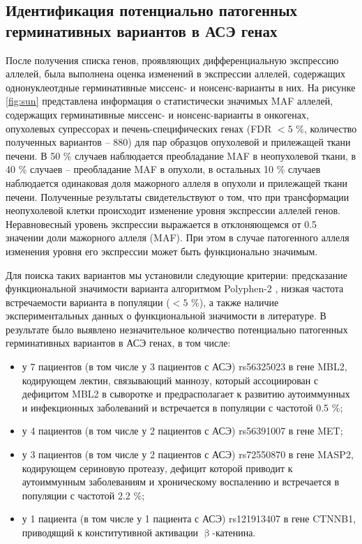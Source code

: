 \subsection{Идентификация потенциально патогенных герминативных вариантов в АСЭ генах}

После получения списка генов, проявляющих дифференциальную экспрессию аллелей, была выполнена оценка изменений в экспрессии аллелей, содержащих  однонуклеотдные герминативные миссенс- и нонсенс-варианты в них. На рисунке \ref{fig:sun} представлена информация о статистически значимых MAF аллелей, содержащих герминативные миссенс- и нонсенс-варианты в онкогенах, опухолевых супрессорах и печень-специфических генах (FDR $< 5$ \%, количество полученных вариантов -- 880) для пар образцов опухолевой и прилежащей ткани печени. В 50 \% случаев наблюдается преобладание MAF в неопухолевой ткани, в 40 \% случаев -- преобладание MAF в опухоли, в остальных 10 \% случаев наблюдается одинаковая доля мажорного аллеля в опухоли и прилежащей ткани печени. Полученные результаты свидетельствуют о том, что при трансформации неопухолевой клетки происходит изменение уровня экспрессии аллелей генов. Неравновесный уровень экспрессии выражается в отклоняющемся от 0.5 значении доли мажорного аллеля (MAF). При этом в случае патогенного аллеля изменения уровня его экспрессии может быть функционально значимым.


Для поиска таких вариантов мы установили следующие критерии: предсказание функциональной значимости варианта алгоритмом Polyphen-2 \cite{adzhubei_predicting_2013}, низкая частота встречаемости варианта в популяции ($< 5$ \%), а также наличие экспериментальных данных о функциональной значимости в литературе. В результате было выявлено незначительное количество потенциально патогенных герминативных вариантов в АСЭ генах, в том числе:

\begin{itemize}
	\item у 7 пациентов (в том числе у 3 пациентов с АСЭ) rs56325023 в гене MBL2, кодирующем лектин, связывающий маннозу, который ассоциирован с дефицитом MBL2 в сыворотке и предрасполагает к развитию аутоиммунных и инфекционных заболеваний и встречается в популяции с частотой 0.5 \%;
	\item у 4 пациентов (в том числе у 2 пациентов с АСЭ) rs56391007 в гене MET;
	\item у 3 пациентов (в том числе у 2 пациентов с АСЭ) rs72550870 в гене MASP2, кодирующем сериновую протеазу, дефицит которой приводит к аутоиммунным заболеваниям и хроническому воспалению и встречается в популяции с частотой 2.2 \%;
	\item у 1 пациента (в том числе у 1 пациента с АСЭ) rs121913407 в гене CTNNB1, приводящий к конститутивной активации $\upbeta$-катенина.
\end{itemize}


